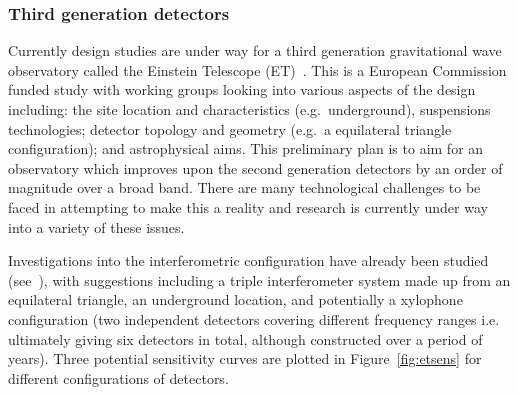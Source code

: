 \documentclass{article}
\begin{document}
\subsubsection{Third generation detectors}

Currently design studies are under way for a third generation gravitational wave
observatory called the Einstein Telescope (ET)~\cite{ETweb}. This is a European
Commission funded study with working groups looking into various aspects of the
design including: the site location and characteristics (e.g.\ underground),
suspensions technologies; detector topology and geometry (e.g.\ a equilateral
triangle configuration); and astrophysical aims. This preliminary plan is to
aim for an observatory which improves upon the second generation detectors by
an order of magnitude over a broad band. There are many technological challenges
to be faced in attempting to make this a reality and research is currently under
way into a variety of these issues.

Investigations into the interferometric configuration have already been studied
(see~\cite{Freise:2008, Hild:2008b, Hild:2010}), with suggestions including a
triple interferometer system made up from an equilateral triangle, an
underground location, and potentially a xylophone configuration (two independent
detectors covering different frequency ranges i.e. ultimately giving six
detectors in total, although constructed over a period of years). Three
potential sensitivity curves are plotted in Figure~\ref{fig:etsens} for different
configurations of detectors.

\end{document}
